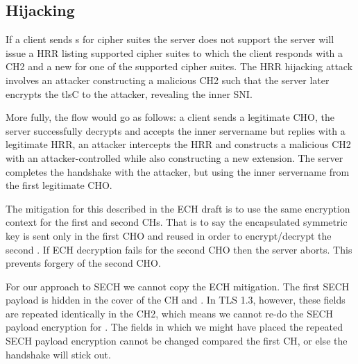 \subsection{ Hijacking}
\label{sec:hrr-hijacking}
If a client sends s for cipher suites the server does not support the
server will issue a \ac{HRR} listing supported cipher suites to which the
client responds with a \ac{CH2} and a new  for one of the supported cipher suites.
The \ac{HRR} hijacking attack involves an attacker constructing a malicious \ac{CH2}
such that the server later encrypts the \ac{tlsC} to the attacker, revealing the inner \ac{SNI}.

More fully, the flow would go as follows: a client sends a legitimate \ac{CHO}, the server successfully
decrypts and accepts the inner servername but replies with
a legitimate \ac{HRR},
an attacker intercepts the \ac{HRR} and constructs
a malicious \ac{CH2} with an attacker-controlled 
while also constructing
a new \varech{} extension.
The server completes the handshake with the attacker,
but using the inner servername
from the first legitimate \ac{CHO}.

The mitigation for this described in the \ac{ECH} draft is to use the same encryption context for the first and second \ac{CH}s.
That is to say the encapsulated symmetric key  is sent only in the first \ac{CHO}
and reused in order to encrypt/decrypt the second \varech{}.
If \ac{ECH} decryption fails for the second \ac{CHO}
then the server aborts.
This prevents forgery of the second \ac{CHO}.

For our approach to \ac{SECH} we cannot copy the \ac{ECH} mitigation.
The first \ac{SECH} payload is hidden in the cover of the \ac{CH}
and \varlegacysessionid{}.
In \ac{TLS} 1.3, however, these fields are repeated identically in the \ac{CH2},
which means we cannot re-do the \ac{SECH} payload encryption for .
The fields in which we might have placed the repeated \ac{SECH} payload encryption
cannot be changed compared the first \ac{CH}, or else
the handshake will stick out.

